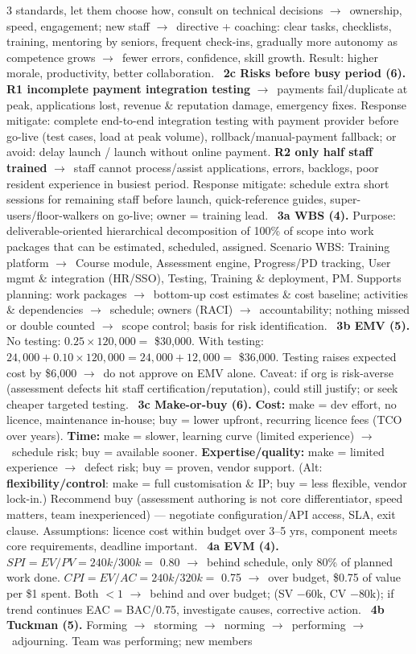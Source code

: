 \documentclass[a4paper,landscape]{article}
\newcommand{\concept}[1]{\textbf{#1}}
\newcommand{\lbl}[1]{\textbf{#1}}
\newcommand{\kh}[1]{{\setlength{\fboxsep}{0.5pt}\colorbox{keyhlcolor}{#1}}}
\newcommand{\ra}{$\rightarrow$}
\begin{document}
\begin{multicols}{3}
standards, let them choose how, consult on technical decisions \ra\ ownership, speed, engagement; new staff \ra\ directive + coaching: clear tasks, checklists, training, mentoring by seniors, frequent check-ins, gradually more autonomy as competence grows \ra\ fewer errors, confidence, skill growth. Result: higher morale, productivity, better collaboration. \textbullet\ \lbl{2c Risks before busy period (6).} \lbl{R1 incomplete payment integration testing} \ra\ payments fail/duplicate at peak, applications lost, revenue \& reputation damage, emergency fixes. Response \kh{mitigate}: complete end-to-end integration testing with payment provider before go-live (test cases, load at peak volume), rollback/manual-payment fallback; or \kh{avoid}: delay launch / launch without online payment. \lbl{R2 only half staff trained} \ra\ staff cannot process/assist applications, errors, backlogs, poor resident experience in busiest period. Response \kh{mitigate}: schedule extra short sessions for remaining staff before launch, quick-reference guides, super-users/floor-walkers on go-live; owner = training lead. \textbullet\ \lbl{3a WBS (4).} Purpose: \kh{deliverable-oriented hierarchical decomposition of 100\% of scope} into work packages that can be estimated, scheduled, assigned. Scenario WBS: Training platform \ra\ Course module, Assessment engine, Progress/PD tracking, User mgmt \& integration (HR/SSO), Testing, Training \& deployment, PM. Supports planning: work packages \ra\ bottom-up cost estimates \& cost baseline; activities \& dependencies \ra\ schedule; owners (RACI) \ra\ accountability; nothing missed or double counted \ra\ scope control; basis for risk identification. \textbullet\ \lbl{3b EMV (5).} No testing: $0.25\times120{,}000=$ \kh{\$30,000}. With testing: $24{,}000+0.10\times120{,}000=24{,}000+12{,}000=$ \kh{\$36,000}. Testing raises expected cost by \$6,000 \ra\ \kh{do not approve on EMV alone}. Caveat: if org is risk-averse (assessment defects hit staff certification/reputation), could still justify; or seek cheaper targeted testing. \textbullet\ \lbl{3c Make-or-buy (6).} \concept{Cost:} make = dev effort, no licence, maintenance in-house; buy = lower upfront, recurring licence fees (TCO over years). \concept{Time:} make = slower, learning curve (limited experience) \ra\ schedule risk; buy = available sooner. \concept{Expertise/quality:} make = limited experience \ra\ defect risk; buy = proven, vendor support. (Alt: \concept{flexibility/control}: make = full customisation \& IP; buy = less flexible, vendor lock-in.) \kh{Recommend buy} (assessment authoring is not core differentiator, speed matters, team inexperienced) --- negotiate configuration/API access, SLA, exit clause. Assumptions: licence cost within budget over 3--5 yrs, component meets core requirements, deadline important. \textbullet\ \lbl{4a EVM (4).} $SPI=EV/PV=240k/300k=$ \kh{0.80} \ra\ behind schedule, only 80\% of planned work done. $CPI=EV/AC=240k/320k=$ \kh{0.75} \ra\ over budget, \$0.75 of value per \$1 spent. Both $<1$ \ra\ behind and over budget; (SV $-$60k, CV $-$80k); if trend continues EAC = BAC/0.75, investigate causes, corrective action. \textbullet\ \lbl{4b Tuckman (5).} Forming \ra\ storming \ra\ norming \ra\ performing \ra\ adjourning. Team was \kh{performing}; new members 
\end{multicols}
\end{document}

